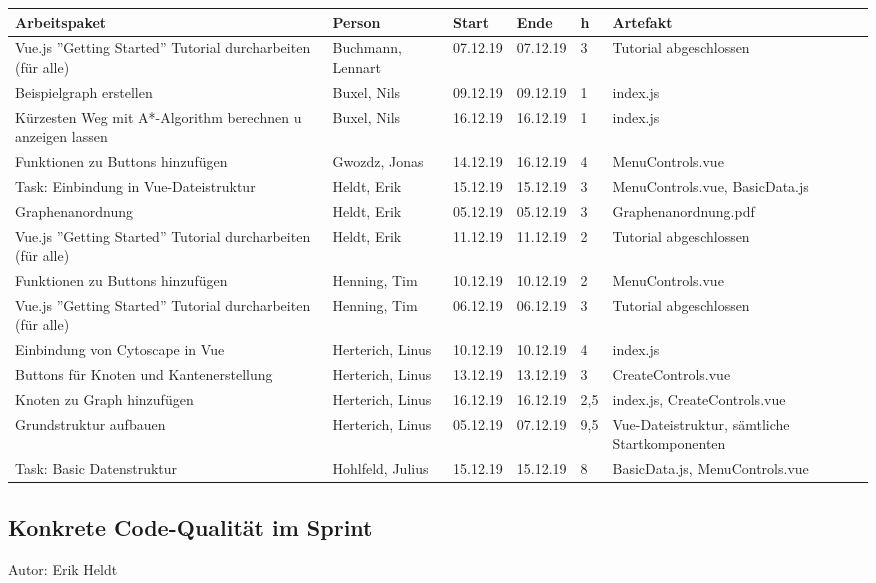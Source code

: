 \begin{longtable}{|p{4cm}|l|l|l|l|p{5cm}|}
        \hline
	Arbeitspaket & Person & Start & Ende & h & Artefakt\\
        \hline
	Vue.js ''Getting Started'' Tutorial durcharbeiten (für alle) & Buchmann, Lennart & 07.12.19 & 07.12.19 & 3 & Tutorial abgeschlossen\\ \hline
	Beispielgraph erstellen & Buxel, Nils & 09.12.19 & 09.12.19 & 1 & index.js\\ \hline
	Kürzesten Weg mit A*-Algorithm berechnen u anzeigen lassen & Buxel, Nils &16.12.19 & 16.12.19 & 1 & index.js\\ \hline
	Funktionen zu Buttons hinzufügen & Gwozdz, Jonas & 14.12.19 & 16.12.19 & 4 & MenuControls.vue\\ \hline
	Task: Einbindung in Vue-Dateistruktur & Heldt, Erik & 15.12.19 & 15.12.19 & 3 & MenuControls.vue, BasicData.js\\ \hline
	Graphenanordnung & Heldt, Erik & 05.12.19 & 05.12.19 & 3 & Graphenanordnung.pdf\\ \hline
	Vue.js ''Getting Started'' Tutorial durcharbeiten (für alle) & Heldt, Erik & 11.12.19 & 11.12.19 & 2 & Tutorial abgeschlossen\\ \hline
	Funktionen zu Buttons hinzufügen & Henning, Tim & 10.12.19 & 10.12.19 & 2 & MenuControls.vue\\ \hline
	Vue.js ''Getting Started'' Tutorial durcharbeiten (für alle) & Henning, Tim & 06.12.19 & 06.12.19 & 3 & Tutorial abgeschlossen\\ \hline
	Einbindung von Cytoscape in Vue & Herterich, Linus & 10.12.19 & 10.12.19 & 4 & index.js\\ \hline
	Buttons für Knoten und Kantenerstellung & Herterich, Linus & 13.12.19 & 13.12.19 & 3 & CreateControls.vue\\ \hline
	Knoten zu Graph hinzufügen & Herterich, Linus & 16.12.19 & 16.12.19 & 2,5 & index.js, CreateControls.vue\\ \hline
	Grundstruktur aufbauen & Herterich, Linus & 05.12.19 & 07.12.19 & 9,5 & Vue-Dateistruktur, sämtliche Startkomponenten\\ \hline
	Task: Basic Datenstruktur & Hohlfeld, Julius & 15.12.19 & 15.12.19 & 8 & BasicData.js, MenuControls.vue\\ \hline
      \end{longtable}

\subsection{Konkrete Code-Qualität im Sprint}
{\small Autor: Erik Heldt}

